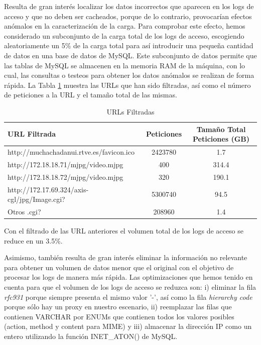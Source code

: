 \documentclass[twocolumn,twoside]{Jornadas}
\begin{document}
Resulta de gran interés localizar los datos incorrectos que aparecen en los logs de acceso y que no deben ser cacheados, porque de lo contrario, provocarían efectos anómalos en la caracterización de la carga. Para comprobar este efecto, hemos considerado un subconjunto de la carga total de los logs de acceso, escogiendo aleatoriamente un 5\% de la carga total para así introducir una pequeña cantidad de datos en una base de datos de MySQL. Este subconjunto de datos permite que las tablas de MySQL se almacenen en la memoria RAM de la máquina, con lo cual, las consultas o testeos para obtener los datos anómalos se realizan de forma rápida.
La Tabla \ref{table:url} muestra las URLs que han sido filtradas, así como el número de peticiones a la URL y el tamaño total de las mismas.

\begin{table}[ht!]
\centering
\renewcommand{\baselinestretch}{1.5}
\scriptsize
\begin{tabular}{|l||c|c|} \hline
URL Filtrada                                  & Peticiones & Tamaño Total Peticiones (GB) \\\hline\hline
http://muchachadanui.rtve.es/favicon.ico      & 2423780    & 1.7                          \\\hline  
http://172.18.18.71/mjpg/video.mjpg           & 400        & 314.4                        \\\hline 
http://172.18.18.72/mjpg/video.mjpg           & 320        & 190.1                        \\\hline 
http://172.17.69.324/axis-cgl/jpg/Image.cgi?  & 5300740    & 94.5                         \\\hline 
Otros .cgi?                                   & 208960     & 1.4                          \\\hline 
\end{tabular}
\caption{URLs Filtradas}
\label{table:url}
\end{table}


Con el filtrado de las URL anteriores el volumen total de los logs de acceso se reduce en un 3.5\%.

Asimismo, también resulta de gran interés eliminar la información no relevante para obtener un volumen de datos menor que el original con el objetivo de procesar los logs de manera más rápida. Las optimizaciones que hemos tenido en cuenta para que el volumen de los logs de acceso se reduzca son: i) eliminar la fila \emph{rfc931} porque siempre presenta el mismo valor '-', así como la fila \emph{hierarchy code} porque sólo hay un proxy en nuestro escenario, ii) reemplazar las filas que contienen VARCHAR por ENUMs que contienen todos los valores posibles (action, method y content para MIME) y iii) almacenar la dirección IP como un entero utilizando la función INET\_ATON() de MySQL.
\end{document}
